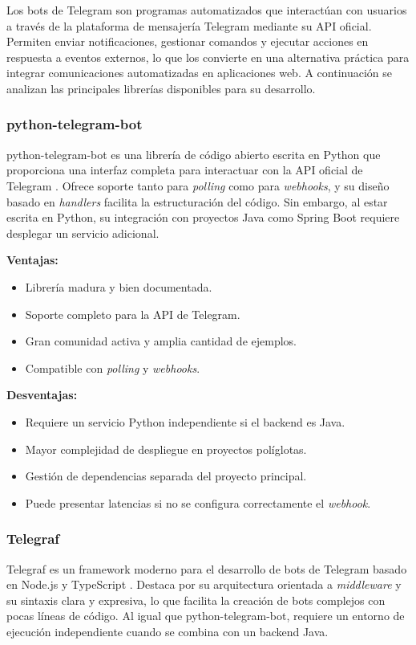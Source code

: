 Los bots de Telegram son programas automatizados que interactúan con usuarios a través de la plataforma de mensajería Telegram mediante su API oficial. Permiten enviar notificaciones, gestionar comandos y ejecutar acciones en respuesta a eventos externos, lo que los convierte en una alternativa práctica para integrar comunicaciones automatizadas en aplicaciones web. A continuación se analizan las principales librerías disponibles para su desarrollo.

\subsubsection{python-telegram-bot}
python-telegram-bot es una librería de código abierto escrita en Python que proporciona una interfaz completa para interactuar con la API oficial de Telegram \cite{pythonTelegramBotDocs}. Ofrece soporte tanto para \textit{polling} como para \textit{webhooks}, y su diseño basado en \textit{handlers} facilita la estructuración del código. Sin embargo, al estar escrita en Python, su integración con proyectos Java como Spring Boot requiere desplegar un servicio adicional.

\textbf{Ventajas:}
\begin{itemize}
    \item Librería madura y bien documentada.
    \item Soporte completo para la API de Telegram.
    \item Gran comunidad activa y amplia cantidad de ejemplos.
    \item Compatible con \textit{polling} y \textit{webhooks}.
\end{itemize}

\textbf{Desventajas:}
\begin{itemize}
    \item Requiere un servicio Python independiente si el backend es Java.
    \item Mayor complejidad de despliegue en proyectos políglotas.
    \item Gestión de dependencias separada del proyecto principal.
    \item Puede presentar latencias si no se configura correctamente el \textit{webhook}.
\end{itemize}

\subsubsection{Telegraf}
Telegraf es un framework moderno para el desarrollo de bots de Telegram basado en Node.js y TypeScript \cite{telegrafDocs}. Destaca por su arquitectura orientada a \textit{middleware} y su sintaxis clara y expresiva, lo que facilita la creación de bots complejos con pocas líneas de código. Al igual que python-telegram-bot, requiere un entorno de ejecución independiente cuando se combina con un backend Java.


